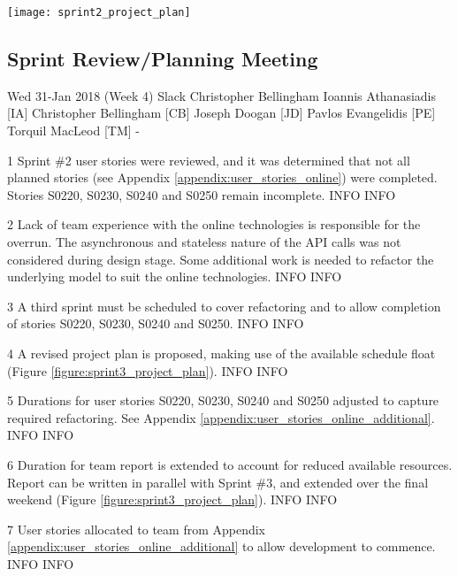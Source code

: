 \begin{center}
	\texttt{[image: sprint2\_project\_plan]}
	\label{figure:sprint2_project_plan}
\end{center}


\newpage
\subsection{Sprint Review/Planning Meeting}
\label{appendix:sprint3_planning_meeting}

\momtoptable
{Wed 31-Jan 2018 (Week 4)}
{Slack}
{Christopher Bellingham}
{Ioannis Athanasiadis [IA]\newline
Christopher Bellingham [CB]\newline
Joseph Doogan [JD]\newline
Pavlos Evangelidis [PE]\newline
Torquil MacLeod [TM]}
{-}

\begin{momitems}
	\momitem
	{1}
	{Sprint \#2 user stories were reviewed, and it was determined that not all planned stories (see Appendix \ref{appendix:user_stories_online}) were completed. Stories S0220, S0230, S0240 and S0250 remain incomplete.}
	{INFO}
	{INFO}

	\momitem
	{2}
	{Lack of team experience with the online technologies is responsible for the overrun. 
	The asynchronous and stateless nature of the API calls was not considered during design stage. Some additional work is needed to refactor the underlying model to suit the online technologies.}
	{INFO}
	{INFO}

	\momitem
	{3}
	{A third sprint must be scheduled to cover refactoring and to allow completion of stories S0220, S0230, S0240 and S0250.}
	{INFO}
	{INFO}

	\momitem
	{4}
	{A revised project plan is proposed, making use of the available schedule float (Figure \ref{figure:sprint3_project_plan}).}
	{INFO}
	{INFO}

	\momitem
	{5}
	{Durations for user stories S0220, S0230, S0240 and S0250 adjusted to capture required refactoring.
	See Appendix \ref{appendix:user_stories_online_additional}.}
	{INFO}
	{INFO}

	\momitem
	{6}
	{Duration for team report is extended to account for reduced available resources.
	Report can be written in parallel with Sprint \#3, and extended over the final weekend (Figure \ref{figure:sprint3_project_plan}).}
	{INFO}
	{INFO}

	\momitem
	{7}
	{User stories allocated to team from Appendix \ref{appendix:user_stories_online_additional} to allow development to commence.}
	{INFO}
	{INFO}
\end{momitems}

